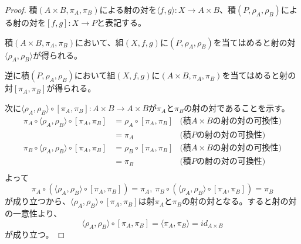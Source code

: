 \documentclass[dvipdfmx]{jsarticle}
\newcommand{\arrow}{\rightarrow}
\newcommand{\tuple}[1]{\langle #1\rangle}
\newcommand{\mor}[3]{#1:#2\arrow #3}
\newtheorem{proof}{証明}[section]
\numberwithin{proof}{subsection}
\numberwithin{prop}{subsection}
\numberwithin{define}{subsection}
\begin{document}
	\begin{proof}
		積$(A\times B,\pi_A,\pi_B)$による射の対を$\mor{\tuple{f,g}}{X}{A\times B}$、積$(P,\rho_A,\rho_B)$による射の対を$\mor{[f,g]}{X}{P}$と表記する。


		積$(A\times B,\pi_A,\pi_B)$において、組$(X,f,g)$に$(P,\rho_A,\rho_B)$を当てはめると射の対$\tuple{\rho_A,\rho_B}$が得られる。

		逆に積$(P,\rho_A,\rho_B)$において組$(X,f,g)$に$(A\times B,\pi_A,\pi_B)$を当てはめると射の対$[\pi_A,\pi_B]$が得られる。
		\begin{center}
		\end{center}
		次に$\mor{\tuple{\rho_A,\rho_B}\circ[\pi_A,\pi_B]}{A\times B}{A\times B}$が$\pi_A$と$\pi_B$の射の対であることを示す。
		\begin{align*}
			\pi_A\circ\tuple{\rho_A,\rho_B}\circ[\pi_A,\pi_B]&=\rho_A\circ[\pi_A,\pi_B]&\text{(積$A\times B$の射の対の可換性)}\\
			&=\pi_A&\text{(積$P$の射の対の可換性)}\\
			\pi_B\circ\tuple{\rho_A,\rho_B}\circ[\pi_A,\pi_B]&=\rho_B\circ[\pi_A,\pi_B]&\text{(積$A\times B$の射の対の可換性)}\\
			&=\pi_B&\text{(積$P$の射の対の可換性)}\\
		\end{align*}
		よって\[\pi_A\circ(\tuple{\rho_A,\rho_B}\circ[\pi_A,\pi_B])=\pi_A,\ \pi_B\circ(\tuple{\rho_A,\rho_B}\circ[\pi_A,\pi_B])=\pi_B\]が成り立つから、$\tuple{\rho_A,\rho_B}\circ[\pi_A,\pi_B]$は射$\pi_A$と$\pi_B$の射の対となる。すると射の対の一意性より、\[\tuple{\rho_A,\rho_B}\circ[\pi_A,\pi_B]=\tuple{\pi_A,\pi_B}=id_{A\times B}\]が成り立つ。

\end{proof}
\end{document}
